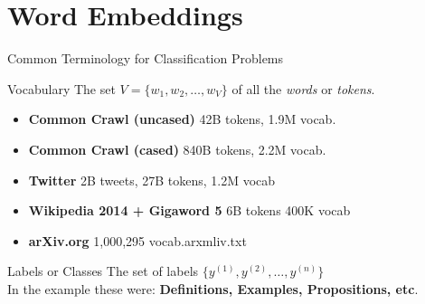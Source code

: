 \documentclass[9pt]{beamer}
\begin{document}
\section{Word Embeddings}
\begin{frame}{Common Terminology for Classification Problems}
    \begin{exampleblock}{Vocabulary}
        The set $V = \{w_1,w_2,\ldots, w_V\}$ of all the \textit{words} or \textit{tokens}.
    \end{exampleblock}
        \begin{itemize}
            \item \textbf{Common Crawl (uncased)} 42B tokens, 1.9M vocab.
            \item \textbf{Common Crawl (cased)} 840B tokens, 2.2M vocab.
            \item \textbf{Twitter} 2B tweets, 27B tokens, 1.2M vocab
            \item \textbf{Wikipedia 2014 + Gigaword 5} 6B tokens 400K vocab
            \item \textbf{arXiv.org} 1,000,295 vocab.arxmliv.txt
        \end{itemize}

        \begin{exampleblock}{Labels or Classes}
            The set of labels $\{y^{(1)},y^{(2)},\ldots, y^{(n)}\}$\\
            In the example these were: \textbf{Definitions, Examples, Propositions, etc}.
        \end{exampleblock}


\end{frame}
\end{document}
